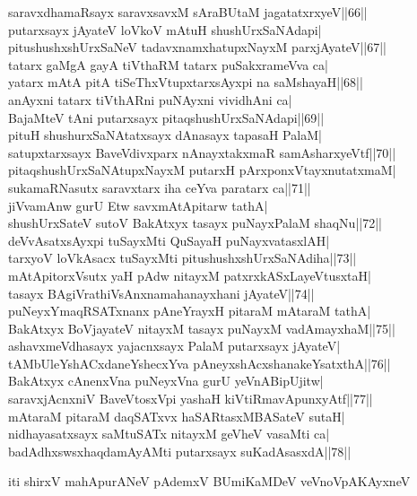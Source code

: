 \documentclass{article}
\begin{document}
saravxdhamaRsayx saravxsavxM sAraBUtaM jagatatxrxyeV||66||\\
putarxsayx jAyateV loVkoV mAtuH shushUrxSaNAdapi|\\
pitushushxshUrxSaNeV tadavxnamxhatupxNayxM parxjAyateV||67||\\
tatarx gaMgA gayA tiVthaRM tatarx puSakxrameVva ca|\\
yatarx mAtA pitA tiSeThxVtupxtarxsAyxpi na saMshayaH||68||\\
anAyxni tatarx tiVthARni puNAyxni vividhAni ca|\\
BajaMteV tAni putarxsayx pitaqshushUrxSaNAdapi||69||\\
pituH shushurxSaNAtatxsayx dAnasayx tapasaH PalaM|\\
satupxtarxsayx BaveVdivxparx nAnayxtakxmaR samAsharxyeVtf||70||\\
pitaqshushUrxSaNAtupxNayxM putarxH pArxponxVtayxnutatxmaM|\\
sukamaRNasutx saravxtarx iha ceYva paratarx ca||71||\\
jiVvamAnw gurU Etw savxmAtApitarw tathA|\\
shushUrxSateV sutoV BakAtxyx tasayx puNayxPalaM shaqNu||72||\\
deVvAsatxsAyxpi tuSayxMti QuSayaH puNayxvatasxlAH|\\
tarxyoV loVkAsacx tuSayxMti pitushushxshUrxSaNAdiha||73||\\
mAtApitorxVsutx yaH pAdw nitayxM patxrxkASxLayeVtusxtaH|\\
tasayx BAgiVrathiVsAnxnamahanayxhani jAyateV||74||\\
puNeyxYmaqRSATxnanx pAneYrayxH pitaraM mAtaraM tathA|\\
BakAtxyx BoVjayateV nitayxM tasayx puNayxM vadAmayxhaM||75||\\
ashavxmeVdhasayx yajacnxsayx PalaM putarxsayx jAyateV|\\
tAMbUleYshACxdaneYshecxYva pAneyxshAcxshanakeYsatxthA||76||\\
BakAtxyx cAnenxVna puNeyxVna gurU yeVnABipUjitw|\\
saravxjAcnxniV BaveVtosxVpi yashaH kiVtiRmavApunxyAtf||77||\\
mAtaraM pitaraM daqSATxvx haSARtasxMBASateV sutaH|\\
nidhayasatxsayx saMtuSATx nitayxM geVheV vasaMti ca|\\
badAdhxswsxhaqdamAyAMti putarxsayx suKadAsasxdA||78||

\begin{center}
iti shirxV mahApurANeV pAdemxV BUmiKaMDeV veVnoVpAKAyxneV
\end{center}
\end{document}
